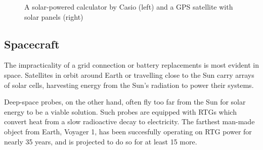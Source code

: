 \documentclass[a4paper,10pt]{article}
\begin{document}
\begin{figure}[h]
\centering
\caption{A solar-powered calculator by Casio (left) and a GPS satellite with solar panels (right)}
\end{figure}


\subsection{Spacecraft}

The impracticality of a grid connection or battery replacements is most evident in space. Satellites in orbit around Earth or travelling close to the Sun carry arrays of solar cells, harvesting energy from the Sun's radiation to power their systems. 

Deep-space probes, on the other hand, often fly too far from the Sun for solar energy to be a viable solution. Such probes are equipped with \acp{RTG} which convert heat from a slow radioactive decay to electricity. The farthest man-made object from Earth, Voyager 1, has been succesfully operating on \ac{RTG} power for nearly 35 years, and is projected to do so for at least 15 more. 
\end{document}
